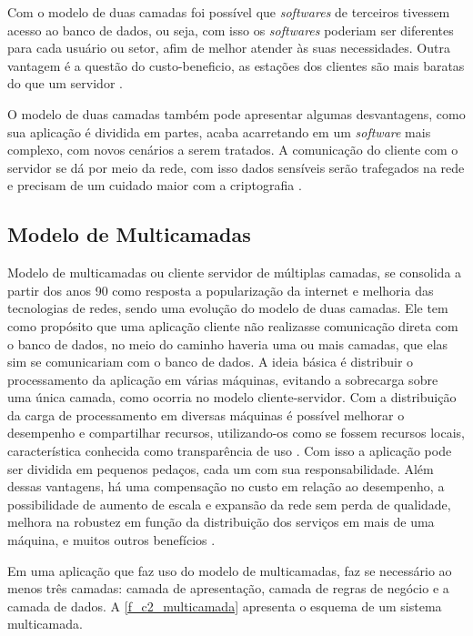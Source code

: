 Com o modelo de duas camadas foi possível que \textit{softwares} de terceiros tivessem acesso ao banco de dados, ou seja, com isso os \textit{softwares} poderiam ser diferentes para cada usuário ou setor, afim de melhor atender às suas necessidades. Outra vantagem é a questão do custo-beneficio, as estações dos clientes são mais baratas do que um servidor \cite{devmediaMultiCamadaP12018}.

O modelo de duas camadas também pode apresentar algumas desvantagens, como sua aplicação é dividida em partes, acaba acarretando em um \textit{software} mais complexo, com novos cenários a serem tratados. A comunicação do cliente com o servidor se dá por meio da rede, com isso dados sensíveis serão trafegados na rede e precisam de um cuidado maior com a criptografia \cite{rocha99}. 

\subsection*{Modelo de Multicamadas}
Modelo de multicamadas ou cliente servidor de múltiplas camadas, se consolida a partir dos anos 90 como resposta a  popularização da internet e melhoria das tecnologias de redes, sendo  uma evolução do modelo de duas camadas. Ele tem como propósito  que uma aplicação cliente não realizasse comunicação direta com o banco de dados, no meio do caminho haveria uma ou mais camadas, que elas sim se comunicariam com o banco de dados. A ideia básica é distribuir o processamento da aplicação em várias máquinas, evitando a sobrecarga sobre uma única camada, como ocorria no modelo cliente-servidor. Com a distribuição da carga de processamento em diversas máquinas é possível melhorar o desempenho e compartilhar recursos, utilizando-os como se fossem recursos locais, característica conhecida como  transparência de uso \cite{devmediaMultiCamadaP12018}. Com isso a aplicação pode ser dividida em pequenos pedaços, cada um com sua responsabilidade. Além dessas vantagens, há uma compensação no custo em relação ao desempenho, a possibilidade de aumento de escala e expansão da rede sem perda de qualidade, melhora na robustez em função da distribuição dos serviços em mais de uma máquina, e muitos outros benefícios \cite{devmediaMultiCamadaP12018}.

Em uma aplicação que faz uso do  modelo de multicamadas, faz se necessário ao menos três camadas: camada de apresentação, camada de regras de negócio e a camada de dados. A \autoref{f_c2_multicamada} apresenta o esquema de um sistema multicamada. 

